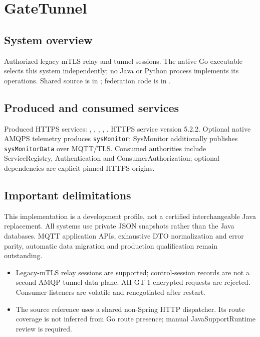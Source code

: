 \documentclass[a4paper]{arrowhead}
\begin{document}
\ArrowheadSetup
\section{GateTunnel}
\subsection{System overview}
Authorized legacy-mTLS relay and tunnel sessions. The native Go executable selects this system independently; no Java or Python process implements its operations. Shared source is in ; federation code is in .
\subsection{Produced and consumed services}
Produced HTTPS services: , \allowbreak {}, \allowbreak {}, \allowbreak {}, \allowbreak {}.
HTTPS service version 5.2.2. Optional native AMQPS telemetry produces \texttt{sysMonitor}; SysMonitor additionally publishes \texttt{sysMonitorData} over MQTT/TLS. Consumed authorities include ServiceRegistry, Authentication and ConsumerAuthorization; optional dependencies are explicit pinned HTTPS origins.
\subsection{Important delimitations}
This implementation is a development profile, not a certified interchangeable Java replacement. All systems use private JSON snapshots rather than the Java databases. MQTT application APIs, exhaustive DTO normalization and error parity, automatic data migration and production qualification remain outstanding.
\begin{itemize}
\item Legacy-mTLS relay sessions are supported; control-session records are not a second AMQP tunnel data plane. AH-GT-1 encrypted requests are rejected. Consumer listeners are volatile and renegotiated after restart.
\item The source reference uses a shared non-Spring HTTP dispatcher. Its route coverage is not inferred from Go route presence; manual JavaSupportRuntime review is required.
\end{itemize}
\end{document}
